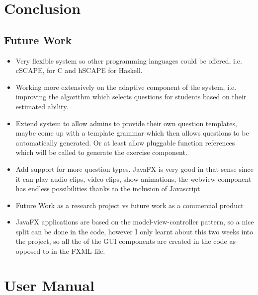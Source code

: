 \documentclass[11pt,a4paper]{report}
\begin{document}
\chapter{Conclusion}
\section{Future Work}
\begin{itemize}
\item Very flexible system so other programming languages could be offered, i.e. cSCAPE, for C and hSCAPE for Haskell. 
\item Working more extensively on the adaptive component of the system, i.e. improving the algorithm which selects questions for students based on their estimated ability.
\item Extend system to allow admins to provide their own question templates, maybe come up with a template grammar which then allows questions to be automatically generated. Or at least allow pluggable function references which will be called to generate the exercise component.
\item Add support for more question types. JavaFX is very good in that sense since it can play audio clips, video clips, show animations, the webview component has endless possibilities thanks to the inclusion of Javascript.
\item Future Work as a research project vs future work as a commercial product
\item JavaFX applications are based on the model-view-controller pattern, so a nice split can be done in the code, however I only learnt about this two weeks into the project, so all the of the GUI components are created in the code as opposed to in the FXML file.
\end{itemize}



\appendix
\chapter{User Manual}
\end{document}
